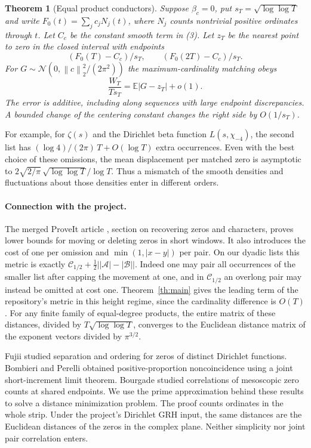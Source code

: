\documentclass[11pt]{article}
\newtheorem{theorem}{Theorem}
\newcommand{\E}{\mathbb E}
\newcommand{\cost}{\mathcal C}
\newcommand{\A}{\mathcal A}
\newcommand{\B}{\mathcal B}
\newcommand{\norm}[1]{\left\lVert #1\right\rVert}
\begin{document}
\begin{theorem}[Equal product conductors]\label{th:end}
Suppose $\beta_c=0$, put $s_T=\sqrt{\log\log T}$ and write $F_0(t)=\sum_j c_j N_j(t)$, where $N_j$ counts nontrivial positive ordinates through $t$. Let $C_c$ be the constant smooth term in (3). Let $z_T$ be the nearest point to zero in the closed interval with endpoints
\[
  (F_0(T)-C_c)/s_T,\qquad (F_0(2T)-C_c)/s_T .
\]
For $G\sim\mathcal N(0,\norm{c}_2^2/(2\pi^2))$ the maximum-cardinality matching obeys
\[
  \frac{W_T}{T s_T}=\E|G-z_T|+o(1).
\]
The error is additive, including along sequences with large endpoint discrepancies. A bounded change of the centering constant changes the right side by $O(1/s_T)$.
\end{theorem}

For example, for $\zeta(s)$ and the Dirichlet beta function $L(s,\chi_{-4})$, the second list has $(\log4)/(2\pi)\,T+O(\log T)$ extra occurrences. Even with the best choice of these omissions, the mean displacement per matched zero is asymptotic to
$2\sqrt{2/\pi}\,\sqrt{\log\log T}/\log T$. Thus a mismatch of the smooth densities and fluctuations about those densities enter in different orders.

\paragraph{Connection with the project.}
The merged ProveIt article \cite{repo}, section on recovering zeros and characters, proves lower bounds for moving or deleting zeros in short windows. It also introduces the cost of one per omission and $\min(1,|x-y|)$ per pair. On our dyadic lists this metric is exactly $\cost_{1/2}+\tfrac12\bigl||\A|-|\B|\bigr|$. Indeed one may pair all occurrences of the smaller list after capping the movement at one, and in $\cost_{1/2}$ an overlong pair may instead be omitted at cost one. Theorem~\ref{th:main} gives the leading term of the repository's metric in this height regime, since the cardinality difference is $O(T)$. For any finite family of equal-degree products, the entire matrix of these distances, divided by $T\sqrt{\log\log T}$, converges to the Euclidean distance matrix of the exponent vectors divided by $\pi^{3/2}$.

Fujii \cite{fujii} studied separation and ordering for zeros of distinct Dirichlet functions. Bombieri and Perelli \cite{bp} obtained positive-proportion noncoincidence using a joint short-increment limit theorem. Bourgade \cite{bourgade} studied correlations of mesoscopic zero counts at shared endpoints. We use the prime approximation behind these results to solve a distance minimization problem. The proof counts ordinates in the whole strip. Under the project's Dirichlet GRH input, the same distances are the Euclidean distances of the zeros in the complex plane. Neither simplicity nor joint pair correlation enters.
\end{document}
